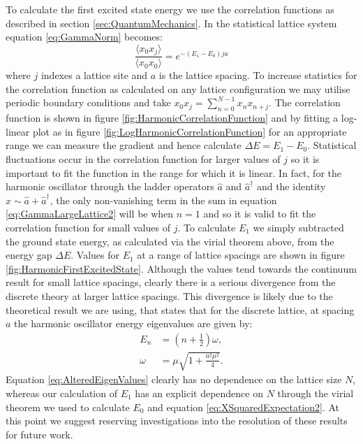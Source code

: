 \documentclass[12pt]{article}
\begin{document}
                To calculate the first excited state energy we use the correlation functions as described in section \ref{sec:QuantumMechanics}. In the statistical lattice system equation \ref{eq:GammaNorm} becomes:
                \begin{equation}
                    \frac{\langle x_{0}x_{j} \rangle}{\langle x_{0}x_{0} \rangle} = e^{-\left(E_1-E_0\right)ja}
                \end{equation}
                where $j$ indexes a lattice site and $a$ is the lattice spacing. To increase statistics for the correlation function as calculated on any lattice configuration we may utilise periodic boundary conditions and take $x_0x_j = \sum_{n=0}^{N-1}x_nx_{n+j}$. The correlation function is shown in figure \ref{fig:HarmonicCorrelationFunction} and by fitting a log-linear plot as in figure \ref{fig:LogHarmonicCorrelationFunction} for an appropriate range we can measure the gradient and hence calculate $\Delta E = E_1 - E_0$. Statistical fluctuations occur in the correlation function for larger values of $j$ so it is important to fit the function in the range for which it is linear. In fact, for the harmonic oscillator through the ladder operators $\hat{a}$ and $\hat{a}^{\dagger}$ and the identity $\hat{x} \sim \hat{a} + \hat{a}^{\dagger}$, the only non-vanishing term in the sum in equation \ref{eq:GammaLargeLattice2} will be when $n=1$ and so it is valid to fit the correlation function for small values of $j$. To calculate $E_1$ we simply subtracted the ground state energy, as calculated via the virial theorem above, from the energy gap $\Delta E$. Values for $E_1$ at a range of lattice spacings are shown in figure \ref{fig:HarmonicFirstExcitedState}. Although the values tend towards the continuum result for small lattice spacings, clearly there is a serious divergence from the discrete theory at larger lattice spacings. This divergence is likely due to the theoretical result we are using, that states that for the discrete lattice, at spacing $a$ the harmonic oscillator energy eigenvalues are given by:
                \begin{align}
                    \label{eq:AlteredEigenValues}
                    E_n  & = \left(n+\frac{1}{2}\right)\omega, \\
                    \omega & = \mu\sqrt{1+\frac{a^2\mu^2}{4}}.
                \end{align} 
                Equation \ref{eq:AlteredEigenValues} clearly has no dependence on the lattice size $N$, whereas our calculation of $E_1$ has an explicit dependence on $N$ through the virial theorem we used to calculate $E_0$ and equation \ref{eq:XSquaredExpectation2}. At this point we suggest reserving investigations into the resolution of these results for future work.
\end{document}
